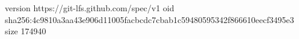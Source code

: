 version https://git-lfs.github.com/spec/v1
oid sha256:4c9810a3aa43e906d11005facbcdc7cbab1c59480595342f866610eecf3495e3
size 174940
